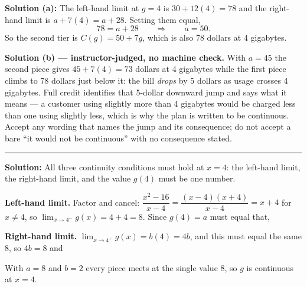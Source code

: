 \documentclass[12pt]{article}
\begin{document}

\textbf{Solution (a):} The left-hand limit at $g = 4$ is $30 + 12(4) = 78$ and
the right-hand limit is $a + 7(4) = a + 28$. Setting them equal,
\[
  78 = a + 28 \qquad\Longrightarrow\qquad a = 50 .
\]
So the second tier is $C(g) = 50 + 7g$, which is also 78 dollars at 4 gigabytes.

\textbf{Solution (b) --- instructor-judged, no machine check.} With $a = 45$ the
second piece gives $45 + 7(4) = 73$ dollars at 4 gigabytes while the first piece
climbs to 78 dollars just below it: the bill \emph{drops} by 5 dollars as usage
crosses 4 gigabytes. Full credit identifies that 5-dollar downward jump and says
what it means --- a customer using slightly more than 4 gigabytes would be
charged less than one using slightly less, which is why the plan is written to be
continuous. Accept any wording that names the jump and its consequence; do not
accept a bare ``it would not be continuous'' with no consequence stated.

\vspace{0.2cm}\noindent\rule{\linewidth}{0.2pt}\vspace{0.2cm}


\textbf{Solution:} All three continuity conditions must hold at $x = 4$: the
left-hand limit, the right-hand limit, and the value $g(4)$ must be one number.

\textbf{Left-hand limit.} Factor and cancel:
$\dfrac{x^2-16}{x-4} = \dfrac{(x-4)(x+4)}{x-4} = x+4$ for $x \neq 4$, so
$\lim_{x \to 4^-} g(x) = 4 + 4 = 8$. Since $g(4) = a$ must equal that,

\textbf{Right-hand limit.} $\lim_{x \to 4^+} g(x) = b(4) = 4b$, and this must
equal the same 8, so $4b = 8$ and 

With $a = 8$ and $b = 2$ every piece meets at the single value 8, so $g$ is
continuous at $x = 4$.
\end{document}
